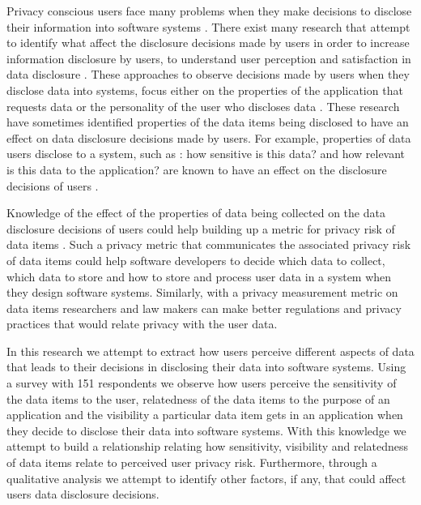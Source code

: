 \documentclass[conference]{IEEEtran}
\begin{document}
Privacy conscious users face many problems when they make decisions to disclose their information into software systems \cite {li2010understanding}. There exist many research that attempt to identify what affect the disclosure decisions made by users in order to increase information disclosure by users, to understand user perception and satisfaction in data disclosure \cite {knijnenburg2013making}. These approaches to observe decisions made by users when they disclose data into systems, focus either on the properties of the application that requests data \cite {li2010understanding, wang2016context, malheiros2013fairly} or the personality of the user who discloses data \cite {nissenbaum2009privacy}. These research have sometimes identified properties of the data items being disclosed to have an effect on data disclosure decisions made by users. For example, properties of data users disclose to a system, such as : how sensitive is this data? and how relevant is this data to the application? are known to have an effect on the disclosure decisions of users \cite {malheiros2013fairly}. 

Knowledge of the effect of the properties of data being collected on the data disclosure decisions of users could help building up a metric for privacy risk of data items \cite {maximilien2009privacy}. Such a privacy metric that communicates the associated privacy risk of data items could help software developers to decide which data to collect, which data to store and how to store and process user data in a system when they design software systems. Similarly, with a privacy measurement metric on data items researchers and law makers can make better regulations and privacy practices that would relate privacy with the user data.

In this research we attempt to extract how users perceive different aspects of data that leads to their decisions in disclosing their data into software systems. Using a survey with 151 respondents we observe how users perceive the sensitivity of the data items to the user, relatedness of the data items to the purpose of an application and the visibility a particular data item gets in an application when they decide to disclose their data into software systems. With this knowledge we attempt to build a relationship relating how sensitivity, visibility and relatedness of data items relate to perceived user privacy risk. Furthermore, through a qualitative analysis we attempt to identify other factors, if any, that could affect users data disclosure decisions.
\end{document}
